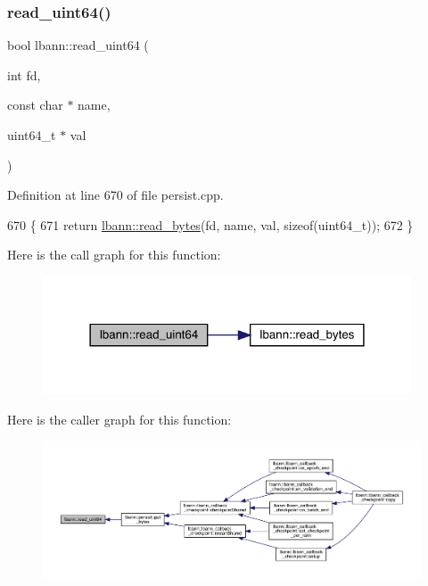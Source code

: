 \subsubsection{\texorpdfstring{read\+\_\+uint64()}{read\_uint64()}}
{\footnotesize\ttfamily bool lbann\+::read\+\_\+uint64 (\begin{DoxyParamCaption}\item[{int}]{fd,  }\item[{const char $\ast$}]{name,  }\item[{uint64\+\_\+t $\ast$}]{val }\end{DoxyParamCaption})}



Definition at line 670 of file persist.\+cpp.


\begin{DoxyCode}
670                                                                \{
671   \textcolor{keywordflow}{return} \hyperlink{namespacelbann_a85385e2a9e058b6720300b4cbdd2b1d0}{lbann::read\_bytes}(fd, name, val, \textcolor{keyword}{sizeof}(uint64\_t));
672 \}
\end{DoxyCode}
Here is the call graph for this function\+:\nopagebreak
\begin{figure}[H]
\begin{center}
\leavevmode
\includegraphics[width=310pt]{namespacelbann_a7ca20ac4f0ec9feaa2f6d5b6ef3c8865_cgraph}
\end{center}
\end{figure}
Here is the caller graph for this function\+:\nopagebreak
\begin{figure}[H]
\begin{center}
\leavevmode
\includegraphics[width=350pt]{namespacelbann_a7ca20ac4f0ec9feaa2f6d5b6ef3c8865_icgraph}
\end{center}
\end{figure}
\mbox{\label{namespacelbann_ab2c2ad3c98b9991a6307b123617dbfb2}} 
